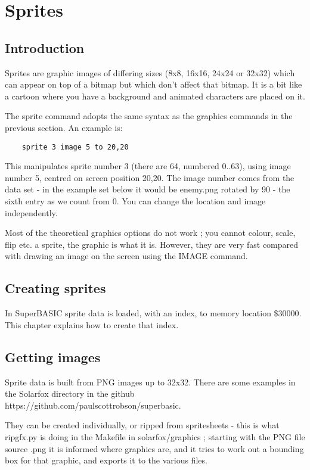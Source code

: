 \chapter{Sprites}

\section{Introduction}

Sprites are graphic images of differing sizes (8x8, 16x16, 24x24 or 32x32) which can appear on top of a bitmap but which don't affect that bitmap. It is a bit like a cartoon where you have a background and animated characters are placed on it.

The sprite command adopts the same syntax as the graphics commands in the previous section. An example is:

\begin{verbatim}
	sprite 3 image 5 to 20,20
\end{verbatim}

This manipulates sprite number 3 (there are 64, numbered 0..63), using image number 5, centred on screen position 20,20. The image number comes from the data set - in the example set below it would be enemy.png rotated by 90 - the sixth entry as we count from 0. You can change the location and image independently.

Most of the theoretical graphics options do not work ; you cannot colour, scale, flip etc. a sprite, the graphic is what it is. However, they are very fast compared with drawing an image on the screen using the IMAGE command.

\section {Creating sprites}

In SuperBASIC sprite data is loaded, with an index, to memory location \$30000. This chapter explains how to create that index.

\section{Getting images}

Sprite data is built from PNG images up to 32x32. There are some examples in the Solarfox directory in the github https://github.com/paulscottrobson/superbasic.

They can be created individually, or ripped from spritesheets - this is what ripgfx.py is doing in the Makefile in solarfox/graphics ; starting with the PNG file source .png it is informed where graphics are, and it tries to work out a bounding box for that graphic, and exports it to the various files.

